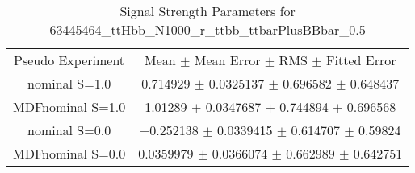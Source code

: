 \begin{table}
\centering
\caption{Signal Strength Parameters for 63445464\_ttHbb\_N1000\_r\_ttbb\_ttbarPlusBBbar\_0.5}
\begin{tabular}{cc}
\toprule
Pseudo Experiment & Mean $\pm$ Mean Error $\pm$ RMS $\pm$ Fitted Error\\
nominal S=1.0 & \num{0.714929} $\pm$ \num{0.0325137} $\pm$ \num{0.696582} $\pm$ \num{0.648437}\\
MDFnominal S=1.0 & \num{1.01289} $\pm$ \num{0.0347687} $\pm$ \num{0.744894} $\pm$ \num{0.696568}\\
nominal S=0.0 & \num{-0.252138} $\pm$ \num{0.0339415} $\pm$ \num{0.614707} $\pm$ \num{0.59824}\\
MDFnominal S=0.0 & \num{0.0359979} $\pm$ \num{0.0366074} $\pm$ \num{0.662989} $\pm$ \num{0.642751}\\
\bottomrule
\end{tabular}
\end{table}